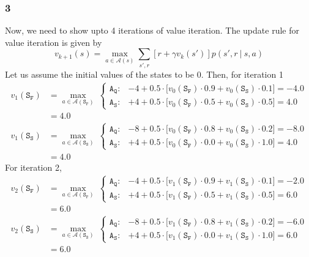 \documentclass[11pt]{article}
\begin{document}
    \subsubsection*{3}
    Now, we need to show upto 4 iterations of value iteration. The update rule for value iteration is given by
    $$v_{k+1}(s) = \max_{a \in \mathcal{A}(s)} \sum_{s', r} \left[ r + \gamma v_{k}(s') \right] p(s', r \ | \ s, a)$$
    Let us assume the initial values of the states to be 0. Then, for iteration 1
    \begin{align*}
        v_{1}(\texttt{S}_{\texttt{F}}) &= \max_{a \in \mathcal{A}(\texttt{S}_{\texttt{F}})} \
        \begin{cases}
            \texttt{A}_{\texttt{Q}}: & -4 + 0.5 \cdot \big[ v_{0}(\texttt{S}_{\texttt{F}}) \cdot 0.9 + v_{0}(\texttt{S}_{\texttt{S}}) \cdot 0.1 \big] = -4.0 \\
            \texttt{A}_{\texttt{S}}: & +4 + 0.5 \cdot \big[ v_{0}(\texttt{S}_{\texttt{F}}) \cdot 0.5 + v_{0}(\texttt{S}_{\texttt{S}}) \cdot 0.5 \big] = 4.0
        \end{cases} \\
        &= 4.0 \\
        v_{1}(\texttt{S}_{\texttt{S}}) &= \max_{a \in \mathcal{A}(\texttt{S}_{\texttt{S}})} \
        \begin{cases}
            \texttt{A}_{\texttt{Q}}: & -8 + 0.5 \cdot \big[ v_{0}(\texttt{S}_{\texttt{F}}) \cdot 0.8 + v_{0}(\texttt{S}_{\texttt{S}}) \cdot 0.2 \big] = -8.0 \\
            \texttt{A}_{\texttt{S}}: & +4 + 0.5 \cdot \big[ v_{0}(\texttt{S}_{\texttt{F}}) \cdot 0.0 + v_{0}(\texttt{S}_{\texttt{S}}) \cdot 1.0 \big] = 4.0
        \end{cases} \\
        &= 4.0
    \end{align*}
    For iteration 2,
    \begin{align*}
        v_{2}(\texttt{S}_{\texttt{F}}) &= \max_{a \in \mathcal{A}(\texttt{S}_{\texttt{F}})} \
        \begin{cases}
            \texttt{A}_{\texttt{Q}}: & -4 + 0.5 \cdot \big[ v_{1}(\texttt{S}_{\texttt{F}}) \cdot 0.9 + v_{1}(\texttt{S}_{\texttt{S}}) \cdot 0.1 \big] = -2.0 \\
            \texttt{A}_{\texttt{S}}: & +4 + 0.5 \cdot \big[ v_{1}(\texttt{S}_{\texttt{F}}) \cdot 0.5 + v_{1}(\texttt{S}_{\texttt{S}}) \cdot 0.5 \big] = 6.0
        \end{cases} \\
        &= 6.0 \\
        v_{2}(\texttt{S}_{\texttt{S}}) &= \max_{a \in \mathcal{A}(\texttt{S}_{\texttt{S}})} \
        \begin{cases}
            \texttt{A}_{\texttt{Q}}: & -8 + 0.5 \cdot \big[ v_{1}(\texttt{S}_{\texttt{F}}) \cdot 0.8 + v_{1}(\texttt{S}_{\texttt{S}}) \cdot 0.2 \big] = -6.0 \\
            \texttt{A}_{\texttt{S}}: & +4 + 0.5 \cdot \big[ v_{1}(\texttt{S}_{\texttt{F}}) \cdot 0.0 + v_{1}(\texttt{S}_{\texttt{S}}) \cdot 1.0 \big] = 6.0
        \end{cases} \\
        &= 6.0
    \end{align*}
\end{document}

